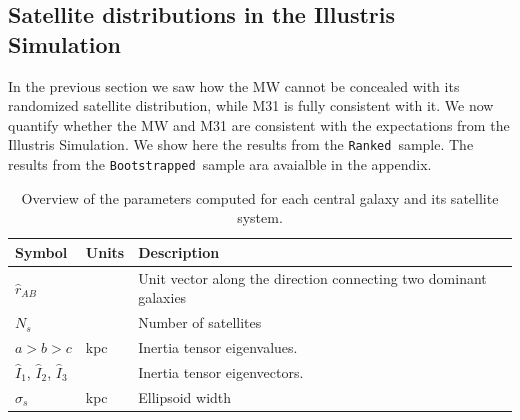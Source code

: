 \documentclass[a4paper,fleqn,usenatbib]{mnras}
\newcommand{\rank}{\texttt{Ranked}}
\newcommand{\boot}{\texttt{Bootstrapped}}
\begin{document}
\subsection{Satellite distributions in the Illustris Simulation}

In the previous section we saw how the MW cannot be concealed with its
randomized satellite distribution, while M31 is fully consistent with
it. 
We now quantify whether the MW and M31 are consistent with the
expectations from the Illustris Simulation.
We show here the results from the \rank\ sample. 
The results from the \boot\ sample ara avaialble in the appendix.









\begin{table}
  \centering
\begin{tabular}{lll}
\hline\hline
Symbol & Units & Description\\\hline
$\hat{r}_{AB}$& & Unit vector along the direction connecting two
dominant galaxies\\
$N_s$ & & Number of satellites\\
$a > b> c$ & kpc & Inertia tensor eigenvalues. \\
$\hat{I}_1$, $\hat{I}_2$, $\hat{I}_3$ & & Inertia tensor eigenvectors. \\
$\sigma_s$ & kpc & Ellipsoid width\\
\hline\hline
\end{tabular}
  \caption{Overview of the parameters computed for each central galaxy
    and its satellite system.
  \label{tab:models}}
\end{table}








\end{document}
